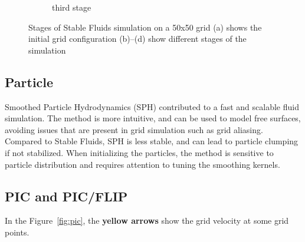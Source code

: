 \begin{figure}[h]
\begin{subfigure}[b]{0.2\textwidth}
        \caption{third stage}
    \end{subfigure}
    \caption{Stages of Stable Fluids simulation on a 50x50 grid
    (a) shows the initial grid configuration
    (b)–(d) show different stages of the simulation}
    \label{fig:grid}
\end{figure}

\subsection{Particle}
Smoothed Particle Hydrodynamics (SPH) contributed to a fast and scalable fluid simulation. The method is more intuitive, and can be used to model free surfaces, avoiding issues that are present in grid simulation such as grid aliasing.
Compared to Stable Fluids, SPH is less stable, and can lead to particle clumping if not stabilized. When initializing the particles, the method is sensitive to particle distribution and requires attention to tuning the smoothing kernels.

\subsection{PIC and PIC/FLIP}

In the Figure~\ref{fig:pic}, the \textbf{yellow arrows} show the grid velocity at some grid points.

